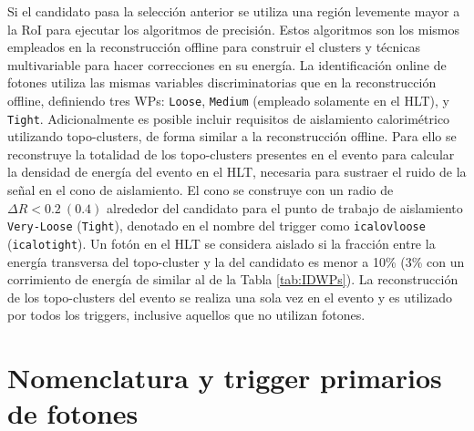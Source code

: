 Si el candidato pasa la selección anterior se utiliza una región levemente mayor a la RoI para ejecutar los algoritmos de precisión. Estos algoritmos son los mismos empleados en la reconstrucción offline \cite{Lampl:1099735} para construir el clusters y técnicas multivariable \cite{PERF-2017-03} para hacer correcciones en su energía. La identificación online de fotones utiliza las mismas variables discriminatorias que en la reconstrucción offline, definiendo tres WPs: \texttt{Loose}, \texttt{Medium} (empleado solamente en el HLT), y \texttt{Tight}.
Adicionalmente es posible incluir requisitos de aislamiento calorimétrico utilizando topo-clusters, de forma similar a la reconstrucción offline. Para ello se reconstruye la totalidad de los topo-clusters presentes en el evento para calcular la densidad de energía del evento en el HLT, necesaria para sustraer el ruido de la señal en el cono de aislamiento. El cono se construye con un radio de  $\Delta R < 0.2\:(0.4)$ alrededor del candidato para el punto de trabajo de aislamiento \texttt{Very-Loose} (\texttt{Tight}), denotado en el nombre del trigger como \texttt{icalovloose} (\texttt{icalotight}). Un fotón en el HLT se considera aislado si la fracción entre la energía transversa del topo-cluster y la del candidato es menor a
10\% (3\% con un corrimiento de energía de  similar al de la Tabla \ref{tab:IDWPs}). La reconstrucción de los topo-clusters del evento se realiza una sola vez en el evento y es utilizado por todos los triggers, inclusive aquellos que no utilizan fotones. 




\section{Nomenclatura y trigger primarios de fotones}





